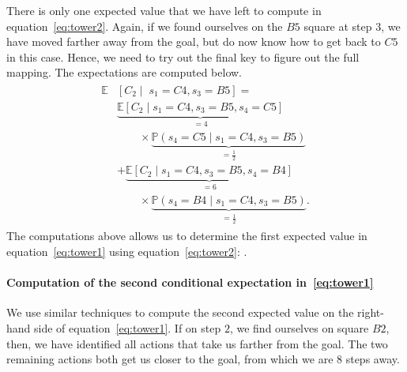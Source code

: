 %
There is only one expected value that we have left to compute in
equation~\eqref{eq:tower2}. Again, if we found ourselves on the $B5$ square at 
step $3$, we have moved farther away from the goal, but do now know how to get 
back to $C5$ in this case. Hence, we need to try out the final key to figure 
out the full mapping. The expectations are computed below.
%
\begin{align*}
    \begin{split}
    \mathbb{E}&[C_2 \mid \; s_1=C4, s_3=B5] = \\
    &\underbrace{\mathbb{E}[C_2 \mid s_1=C4, s_3=B5, s_4=C5]}_{=4} \\ &{\phantom{1234}} \times \underbrace{\mathbb{P}(s_4=C5 \mid s_1=C4, s_3=B5)}_{=\frac{1}{2}} \\
    &+ \underbrace{\mathbb{E}[C_2 \mid s_1=C4, s_3=B5, s_4=B4]}_{=6} \\ &\phantom{1234} \times \underbrace{\mathbb{P}(s_4=B4 \mid s_1=C4, s_3=B5)}_{=\frac{1}{2}}.
    \end{split}
\end{align*}
%
The computations above allows us to determine the first expected value in
equation~\eqref{eq:tower1} using equation~\eqref{eq:tower2}:
.

\paragraph{Computation of the second conditional expectation
in~\eqref{eq:tower1}} 
%
We use similar techniques to compute the second expected value on the right-hand
side of equation~\eqref{eq:tower1}. If on step $2$, we find ourselves on square 
$B2$, then, we have identified all actions that take us farther from the goal. 
The two remaining actions both get us closer to the goal, from which we are $8$
steps away.
%

